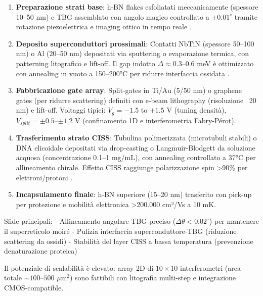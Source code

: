\documentclass[11pt,a4paper]{article}
\let\oldcite\cite
\renewcommand{\cite}{\protect\oldcite}
\theoremstyle{plain}
\theoremstyle{definition}
\begin{document}
\begin{enumerate}
    \item \textbf{Preparazione strati base}: h-BN flakes esfoliatati meccanicamente (spessore 10–50 nm) e TBG assemblato con angolo magico controllato a $\pm 0.01^\circ$ tramite rotazione piezoelettrica e imaging ottico in tempo reale \cite{kim2017van, yankowitz2019tuning}.
    
    \item \textbf{Deposito superconduttori prossimali}: Contatti NbTiN (spessore 50–100 nm) o Al (20–50 nm) depositati via sputtering o evaporazione termica, con patterning litografico e lift-off. Il gap indotto $\Delta \approx 0.3$--$0.6$ meV è ottimizzato con annealing in vuoto a 150–200°C per ridurre interfaccia ossidata \cite{rokhinson2012observation, mourik2012signatures}.
    
    \item \textbf{Fabbricazione gate array}: Split-gates in Ti/Au (5/50 nm) o graphene gates (per ridurre scattering) definiti con e-beam lithography (risoluzione ~20 nm) e lift-off. Voltaggi tipici: $V_g = -1.5$ to $+1.5$ V (tuning densità), $V_{split} = \pm 0.5$--$\pm 1.2$ V (confinamento 1D e interferometria Fabry-Pérot).
    
    \item \textbf{Trasferimento strato CISS}: Tubulina polimerizzata (microtubuli stabili) o DNA elicoidale depositati via drop-casting o Langmuir-Blodgett da soluzione acquosa (concentrazione 0.1–1 mg/mL), con annealing controllato a 37°C per allineamento chirale. Effetto CISS raggiunge polarizzazione spin >90\% per elettroni/protoni \cite{naaman2019spin, kumar2026ciss}.
    
    \item \textbf{Incapsulamento finale}: h-BN superiore (15–20 nm) trasferito con pick-up per protezione e mobilità elettronica >200.000 cm²/Vs a 10 mK.
\end{enumerate}

Sfide principali:
- Allineamento angolare TBG preciso ($\Delta\theta < 0.02^\circ$) per mantenere il superreticolo moiré
- Pulizia interfaccia superconduttore-TBG (riduzione scattering da ossidi)
- Stabilità del layer CISS a bassa temperatura (prevenzione denaturazione proteica)

Il potenziale di scalabilità è elevato: array 2D di $10\times10$ interferometri (area totale $\sim 100$--$500$ $\mu$m$^2$) sono fattibili con litografia multi-step e integrazione CMOS-compatible.
\end{document}
